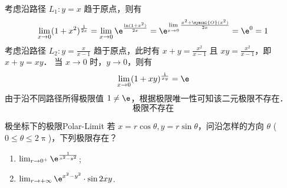 \begin{solution}
    考虑沿路径 $L_1: y = x$ 趋于原点，则有
    \begin{equation}
        \lim_{x \to 0} (1 + x^2)^{\frac{1}{2x}} = \lim_{x \to 0} \e^{\frac{\ln(1 + x^2)}{2x}} = \e^{\lim\limits_{x \to 0} \frac{x^2 + \symcal{O}(x^2)}{2x}} = \e^0 = 1
    \end{equation}
    考虑沿路径 $L_2: y = \frac{x}{x - 1}$ 趋于原点，此时有 $x + y = \frac{x^2}{x - 1}$ 且 $xy = \frac{x^2}{x - 1}$，即 $x + y = xy$．
    当 $x \to 0$ 时，$y \to 0$，则有
    \begin{equation}
        \lim_{x \to 0} (1 + xy)^{\frac{1}{xy}} = \e
    \end{equation}
    由于沿不同路径所得极限值 $1 \neq \e$，根据极限唯一性可知该二元极限不存在．
    \begin{equation}
        \boxed{\text{极限不存在}}
    \end{equation}
\end{solution}


\begin{problem}{极坐标下的极限}{Polar-Limit}
    若 $x = r \cos \theta, y = r \sin \theta$，问沿怎样的方向 $\theta$ ($0 \le \theta \le 2\uppi$)，下列极限存在？
    \begin{enumerate}
        \item $ \lim_{r \to 0^+} \e^{\frac{1}{x^2 - y^2}}$;
        \item $ \lim_{r \to +\infty} \e^{x^2 - y^2} \cdot \sin 2xy$.
    \end{enumerate}
\end{problem}

